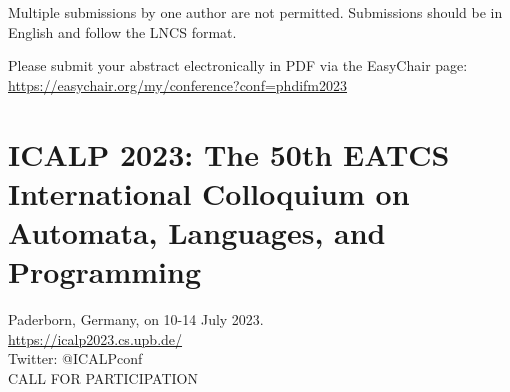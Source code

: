\documentclass[prodmode,acmtecs]{acmsmall} %
\begin{document}
\begin{itemize}
  Multiple submissions by one author are not permitted. Submissions should be in English and follow the LNCS format. 
 
  Please submit your abstract electronically in PDF via the EasyChair page: \href{https://easychair.org/my/conference?conf=phdifm2023}{https://easychair.org/my/conference?conf=phdifm2023} 
 
\end{itemize}\section{ICALP 2023: The 50th EATCS International Colloquium on Automata, Languages, and Programming}\label{ICALP2023}  Paderborn, Germany, on 10-14 July 2023.\\ 
  \href{https://icalp2023.cs.upb.de/}{https://icalp2023.cs.upb.de/}\\ 
  Twitter: @ICALPconf\\ 
CALL FOR PARTICIPATION 
\end{document}
